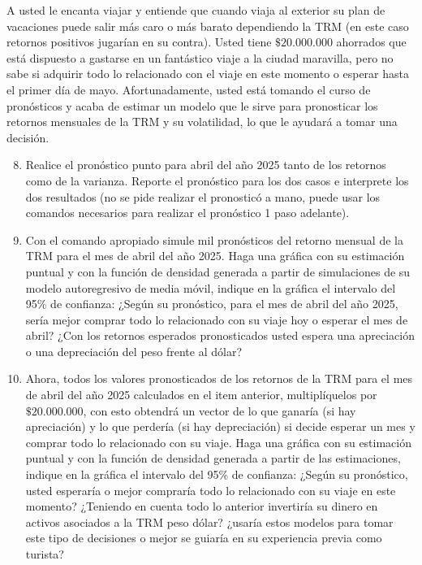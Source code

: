 \documentclass{article}
\theoremstyle{remark}
\theoremstyle{definition}
\begin{document}
{A usted le encanta viajar y entiende que cuando viaja al exterior su plan de vacaciones puede salir m\'as caro o m\'as barato dependiendo la TRM (en este caso retornos positivos jugar\'ian en su contra). Usted tiene $\$20.000.000$ ahorrados que est\'a dispuesto a gastarse en un fant\'astico viaje a la ciudad maravilla, pero no sabe si adquirir todo lo relacionado con el viaje en este momento o esperar hasta el primer d\'ia de mayo. Afortunadamente, usted est\'a tomando el curso de pron\'osticos y acaba de estimar un modelo que le sirve para pronosticar los retornos mensuales de la TRM y su volatilidad, lo que le ayudar\'a a tomar una decisi\'on.}

\begin{enumerate}[label = \emph{\alph*})]\setcounter{enumi}{7}
    \item {Realice el pron\'ostico punto para abril del año 2025 tanto de los retornos como de la varianza. Reporte el pron\'ostico para los dos casos e interprete los dos resultados (no se pide realizar el pronostic\'o a mano, puede usar los comandos necesarios para realizar el pron\'ostico 1 paso adelante).}
        \begin{tcolorbox}[title=Soluci\'on 2.h]
            
        \end{tcolorbox}
    \item {Con el comando apropiado simule mil pron\'osticos del retorno mensual de la TRM para el mes de abril del año 2025. Haga una gr\'afica con su estimaci\'on puntual y con la funci\'on de densidad generada a partir de simulaciones de su modelo autoregresivo de media m\'ovil, indique en la gr\'afica el intervalo del 95\% de confianza: ¿Seg\'un su pron\'ostico, para el mes de abril del año 2025, ser\'ia mejor comprar todo lo relacionado con su viaje hoy o esperar el mes de abril? ¿Con los retornos esperados pronosticados usted espera una apreciaci\'on o una depreciaci\'on del peso frente al d\'olar?}
        \begin{tcolorbox}[title=Soluci\'on 2.i]
            
        \end{tcolorbox}
    \item {Ahora, todos los valores pronosticados de los retornos de la TRM para el mes de abril del año 2025 calculados en el item anterior, multipl\'iquelos por $\$20.000.000$, con esto obtendr\'a un vector de lo que ganar\'ia (si hay apreciaci\'on) y lo que perder\'ia (si hay depreciaci\'on) si decide esperar un mes y comprar todo lo relacionado con su viaje. Haga una gr\'afica con su estimaci\'on puntual y con la funci\'on de densidad generada a partir de las estimaciones, indique en la gr\'afica el intervalo del 95\% de confianza: ¿Seg\'un su pron\'ostico, usted esperar\'ia o mejor comprar\'ia todo lo relacionado con su viaje en este momento? ¿Teniendo en cuenta todo lo anterior invertir\'ia su dinero en activos asociados a la TRM peso d\'olar? ¿usar\'ia estos modelos para tomar este tipo de decisiones o mejor se guiar\'ia en su experiencia previa como turista?}
        \begin{tcolorbox}[title=Soluci\'on 2.j]
            

\end{tcolorbox}
\end{enumerate}
\end{document}
